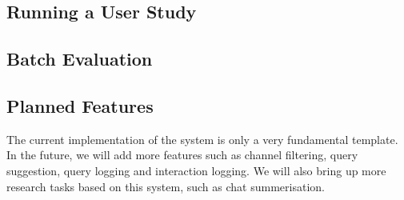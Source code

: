 \subsection{Running a User Study}


\subsection{Batch Evaluation}


\subsection{Planned Features}
The current implementation of the system is only a very fundamental template. In the future, we will add more features such as channel filtering, query suggestion, query logging and interaction logging. We will also bring up more research tasks based on this system, such as chat summerisation.





